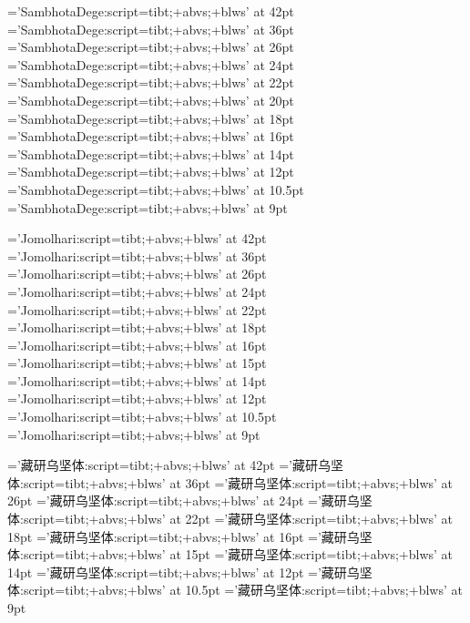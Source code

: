﻿
%
%

\def\TibeX{\hbox{Tib\kern-.1em \lower.5ex\hbox{E}\kern-.125em X}}

\font\SamThug='SambhotaDege:script=tibt;+abvs;+blws' at 42pt
\font\SamThugu='SambhotaDege:script=tibt;+abvs;+blws' at 36pt
\font\SamkCig='SambhotaDege:script=tibt;+abvs;+blws' at 26pt
\font\SamkCigChung='SambhotaDege:script=tibt;+abvs;+blws' at 24pt
\font\SamkNyis='SambhotaDege:script=tibt;+abvs;+blws' at 22pt
\font\SamkNyisChung='SambhotaDege:script=tibt;+abvs;+blws' at 20pt
\font\SamkSum='SambhotaDege:script=tibt;+abvs;+blws' at 18pt
\font\SamkSumChung='SambhotaDege:script=tibt;+abvs;+blws' at 16pt
\font\SambZhi='SambhotaDege:script=tibt;+abvs;+blws' at 14pt
\font\SambZhiChung='SambhotaDege:script=tibt;+abvs;+blws' at 12pt
\font\SamlNga='SambhotaDege:script=tibt;+abvs;+blws' at 10.5pt
\font\SamlNgaChung='SambhotaDege:script=tibt;+abvs;+blws' at 9pt
\let\Sam=\SamkNyisChung \let\sam=\Sam
\let\SamChe=\SamkNyis
\let\SamAu=\SamkSum

\font\JoThig='Jomolhari:script=tibt;+abvs;+blws' at 42pt
\font\JoThigu='Jomolhari:script=tibt;+abvs;+blws' at 36pt
\font\JokCig='Jomolhari:script=tibt;+abvs;+blws' at 26pt
\font\JokCigChung='Jomolhari:script=tibt;+abvs;+blws' at 24pt
\font\JokNyis='Jomolhari:script=tibt;+abvs;+blws' at 22pt
\font\JokNyisChung='Jomolhari:script=tibt;+abvs;+blws' at 18pt
\font\JokSum='Jomolhari:script=tibt;+abvs;+blws' at 16pt
\font\JokSumChung='Jomolhari:script=tibt;+abvs;+blws' at 15pt
\font\JobZhi='Jomolhari:script=tibt;+abvs;+blws' at 14pt
\font\JobZhiChung='Jomolhari:script=tibt;+abvs;+blws' at 12pt
\font\JolNga='Jomolhari:script=tibt;+abvs;+blws' at 10.5pt
\font\JolNgaChung='Jomolhari:script=tibt;+abvs;+blws' at 9pt
\let\Jo=\JokNyisChung \let\jo=\JokSum
\let\JoChe=\JokNyis
\let\JoAu=\JokSum

\font\ZhibThig='藏研乌坚体:script=tibt;+abvs;+blws' at 42pt
\font\ZhibThigu='藏研乌坚体:script=tibt;+abvs;+blws' at 36pt
\font\ZhibkCig='藏研乌坚体:script=tibt;+abvs;+blws' at 26pt
\font\ZhibkCigChung='藏研乌坚体:script=tibt;+abvs;+blws' at 24pt
\font\ZhibkNyis='藏研乌坚体:script=tibt;+abvs;+blws' at 22pt
\font\ZhibkNyisChung='藏研乌坚体:script=tibt;+abvs;+blws' at 18pt
\font\ZhibkSum='藏研乌坚体:script=tibt;+abvs;+blws' at 16pt
\font\ZhibkSumChung='藏研乌坚体:script=tibt;+abvs;+blws' at 15pt
\font\ZhibbZhi='藏研乌坚体:script=tibt;+abvs;+blws' at 14pt
\font\ZhibbZhiChung='藏研乌坚体:script=tibt;+abvs;+blws' at 12pt
\font\ZhiblNga='藏研乌坚体:script=tibt;+abvs;+blws' at 10.5pt
\font\ZhiblNgaChung='藏研乌坚体:script=tibt;+abvs;+blws' at 9pt
\let\Zhib=\ZhibkSum \let\zhib=\ZhibkSum
\let\ZhibChe=\ZhibkNyis

